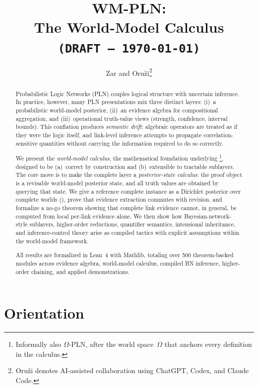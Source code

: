 \documentclass[11pt,openany]{report}
\title{WM-PLN:\\[4pt]
  The World-Model Calculus\\[12pt]
  \large\texttt{(DRAFT --- \today)}}
\author{Zar and Oru\v{z}i\thanks{%
  Oru\v{z}i denotes AI-assisted collaboration using ChatGPT, Codex, and Claude Code.}}
\date{}
\begin{document}
\maketitle

\begin{abstract}
Probabilistic Logic Networks (PLN) couples logical structure with uncertain
inference.  In practice, however, many PLN presentations mix three distinct
layers: (i)~a probabilistic world-model posterior, (ii)~an evidence algebra
for compositional aggregation, and (iii)~operational truth-value views
(strength, confidence, interval bounds).  This conflation produces
\emph{semantic drift}: algebraic operators are treated as if they were the
logic itself, and link-level inference attempts to propagate
correlation-sensitive quantities without carrying the information required to
do so correctly.

We present the \emph{world-model calculus}, the mathematical foundation
underlying \xiPLN{}\footnote{Informally also $\Omega$-PLN, after the
world space~$\Omega$ that anchors every definition in the calculus.},
designed to be (a)~correct by construction and
(b)~extensible to tractable sublayers.  The core move is to make the
complete layer a \emph{posterior-state calculus}: the proof object is a
revisable world-model posterior state, and all truth values are obtained
by querying that state.  We give a reference complete
instance as a Dirichlet posterior over complete worlds (\JointEvidence{}),
prove that evidence extraction commutes with revision, and formalize a no-go
theorem showing that complete link evidence cannot, in general, be computed
from local per-link evidence alone.  We then show how Bayesian-network-style
sublayers, higher-order reductions, quantifier semantics, intensional
inheritance, and inference-control theory arise as compiled tactics with
explicit assumptions within the world-model framework.

All results are formalized in Lean~4 with Mathlib, totaling over 500
theorem-backed modules across evidence algebra, world-model calculus,
compiled BN inference, higher-order chaining, and applied
demonstrations.
\end{abstract}

\tableofcontents

\part{Orientation}
\label{part:orientation}
\end{document}
